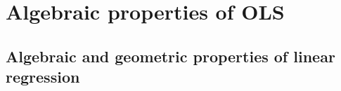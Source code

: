 

\chapter{Algebraic properties of OLS}

\section{Algebraic and geometric properties of linear regression}

